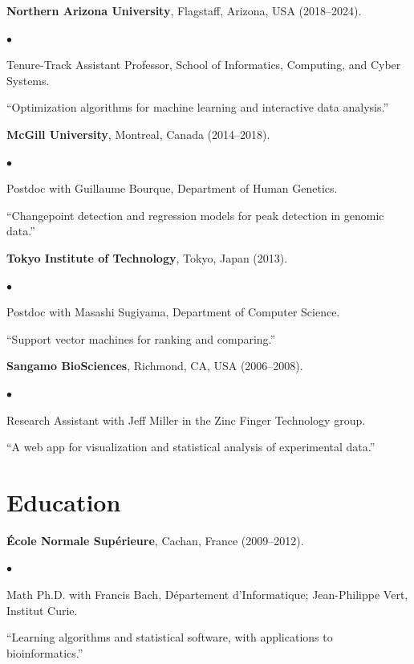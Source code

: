 \documentclass[margin,line]{res}
\newenvironment{list2}{
  \begin{list}{$\bullet$}{%
      \setlength{\itemsep}{0in}
      \setlength{\parsep}{0in} \setlength{\parskip}{0in}
      \setlength{\topsep}{0in} \setlength{\partopsep}{0in} 
      \setlength{\leftmargin}{0.2in}}}{\end{list}}
\begin{document}
\begin{resume}
{\bf Northern Arizona University}, Flagstaff, Arizona, USA (2018--2024).\\
\vspace*{-.1in}
\begin{list2}
\item[] Tenure-Track Assistant Professor, School of Informatics, Computing, and Cyber Systems.
\item[] ``Optimization algorithms for machine learning and interactive data analysis.''
\end{list2}

{\bf McGill University}, Montreal, Canada (2014--2018).\\
\vspace*{-.1in}
\begin{list2}
\item[] Postdoc with Guillaume Bourque, Department of Human Genetics.
\item[]``Changepoint detection and regression models for peak detection in genomic data.''
\end{list2}

{\bf Tokyo Institute of Technology}, Tokyo, Japan (2013).\\
\vspace*{-.1in}
\begin{list2}
\item[] Postdoc with Masashi Sugiyama, Department of Computer Science.
\item[] ``Support vector machines for ranking and comparing.''
\end{list2}

{\bf Sangamo BioSciences}, Richmond, CA, USA (2006--2008).\\
\vspace*{-.1in}
\begin{list2}
\item[] Research Assistant with Jeff Miller in the Zinc Finger Technology group.
\item[] ``A web app for visualization and statistical analysis of experimental data.''
\end{list2}

\section{\sc Education}

{\bf \'{E}cole Normale Sup\'{e}rieure}, Cachan, France (2009--2012).\\
\vspace*{-.1in}
\begin{list2}
\item[] Math Ph.D. with Francis Bach, D\'{e}partement d'Informatique; Jean-Philippe Vert, Institut Curie.
\item[] ``Learning algorithms and statistical software, with applications to bioinformatics.''
\end{list2}


\end{resume}
\end{document}
